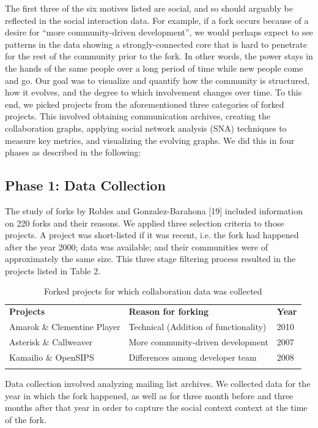 \documentclass[ifip]{svmult}
\begin{document}
The first three of the six motives listed are social, and so should arguably be reflected in the social interaction data. For example, if a fork occurs because of a desire for ``more community-driven development'', we would perhaps expect to see patterns in the data showing a strongly-connected core that is hard to penetrate for the rest of the community prior to the fork. In other words, the power stays in the hands of the same people over a long period of time while new people come and go. Our goal was to visualize and quantify how the community is structured, how it evolves, and the degree to which involvement changes over time. To this end, we picked projects from the aforementioned three categories of forked projects. This involved obtaining communication archives, creating the collaboration graphs, applying social network analysis (SNA) techniques to measure key metrics, and visualizing the evolving graphs. We did this in four phases as described in the following:

\subsection{Phase 1: Data Collection}
	 
The study of forks by Robles and Gonzalez-Barahona [19] included information on 220 forks and their reasons. We applied three selection criteria to those projects. A project was short-listed if it was recent, i.e. the fork had happened after the year 2000; data was available; and their communities were of approximately the same size. This three stage filtering process resulted in the projects listed in Table 2. 

\begin{table}
\centering
\caption{Forked projects for which collaboration data was collected}
\label{tab:3}       %
%
%
\begin{tabular}{p{1.8in} p{2.3in} p{0.5in}}
\hline\noalign{\smallskip}
\textbf{Projects} & \textbf{Reason for forking} & \textbf{Year} \\
\noalign{\smallskip}\hline\noalign{\smallskip}
Amarok \& Clementine Player & Technical (Addition of functionality) & 2010\\ \hline
Asterisk \& Callweaver & More community-driven development & 2007\\ \hline
Kamailio \& OpenSIPS & Differences among developer team & 2008 \\ 
\noalign{\smallskip}\hline
\end{tabular}
\end{table}
Data collection involved analyzing mailing list archives. We collected data for the year in which the fork happened, as well as for three month before and three months after that year in order to capture the social context context at the time of the fork.
\end{document}
